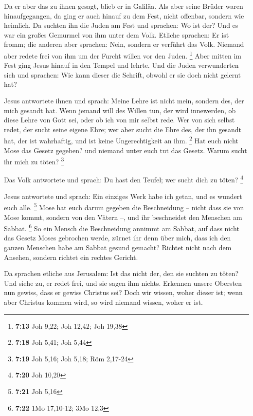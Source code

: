  Da er aber das zu ihnen gesagt, blieb er in Galiläa.
 Als aber seine Brüder waren hinaufgegangen, da ging er
auch hinauf zu dem Fest, nicht offenbar, sondern wie heimlich.
 Da suchten ihn die Juden am Fest und sprachen: Wo ist
der?  Und es war ein großes Gemurmel von ihm unter dem
Volk. Etliche sprachen: Er ist fromm; die anderen aber sprachen: Nein,
sondern er verführt das Volk.  Niemand aber redete frei
von ihm um der Furcht willen vor den Juden. \footnote{\textbf{7:13} Joh
  9,22; Joh 12,42; Joh 19,38}  Aber mitten im Fest ging
Jesus hinauf in den Tempel und lehrte.  Und die Juden
verwunderten sich und sprachen: Wie kann dieser die Schrift, obwohl er
sie doch nicht gelernt hat?

 Jesus antwortete ihnen und sprach: Meine Lehre ist nicht
mein, sondern des, der mich gesandt hat.  Wenn jemand
will des Willen tun, der wird innewerden, ob diese Lehre von Gott sei,
oder ob ich von mir selbst rede.  Wer von sich selbst
redet, der sucht seine eigene Ehre; wer aber sucht die Ehre des, der ihn
gesandt hat, der ist wahrhaftig, und ist keine Ungerechtigkeit an ihm.
\footnote{\textbf{7:18} Joh 5,41; Joh 5,44}  Hat euch
nicht Mose das Gesetz gegeben? und niemand unter euch tut das Gesetz.
Warum sucht ihr mich zu töten? \footnote{\textbf{7:19} Joh 5,16; Joh
  5,18; Röm 2,17-24}

 Das Volk antwortete und sprach: Du hast den Teufel; wer
sucht dich zu töten? \footnote{\textbf{7:20} Joh 10,20}

 Jesus antwortete und sprach: Ein einziges Werk habe ich
getan, und es wundert euch alle. \footnote{\textbf{7:21} Joh 5,16}
 Mose hat euch darum gegeben die Beschneidung -- nicht
dass sie von Mose kommt, sondern von den Vätern --, und ihr beschneidet
den Menschen am Sabbat. \footnote{\textbf{7:22} 1Mo 17,10-12; 3Mo 12,3}
 So ein Mensch die Beschneidung annimmt am Sabbat, auf
dass nicht das Gesetz Moses gebrochen werde, zürnet ihr denn über mich,
dass ich den ganzen Menschen habe am Sabbat gesund gemacht?
 Richtet nicht nach dem Ansehen, sondern richtet ein
rechtes Gericht.

 Da sprachen etliche aus Jerusalem: Ist das nicht der,
den sie suchten zu töten?  Und siehe zu, er redet frei,
und sie sagen ihm nichts. Erkennen unsere Obersten nun gewiss, dass er
gewiss Christus sei?  Doch wir wissen, woher dieser ist;
wenn aber Christus kommen wird, so wird niemand wissen, woher er ist.

